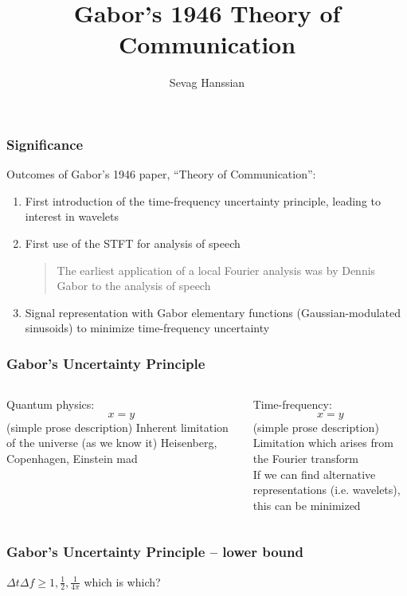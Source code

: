 \documentclass{beamer}
\title{Gabor's 1946 Theory of Communication}
\author{Sevag Hanssian}
\institute{MUMT 622, Winter 2021}
\begin{document}
\begin{frame}
\maketitle
\end{frame}

\begin{frame}
	\frametitle{Significance}
	Outcomes of Gabor's 1946 paper, ``Theory of Communication'':
	\vspace{0.5em}
	\begin{enumerate}
		\item
			First introduction of the time-frequency uncertainty principle, leading to interest in wavelets
		\item
			First use of the STFT for analysis of speech
			\begin{quote}
			The earliest application of a local Fourier analysis was by Dennis Gabor to the analysis of speech
			\end{quote}
		\item
			\vspace{-0.35em}
			Signal representation with Gabor elementary functions (Gaussian-modulated sinusoids) to minimize time-frequency uncertainty
	\end{enumerate}
\end{frame}

\begin{frame}
	\frametitle{Gabor's Uncertainty Principle}
	\begin{columns}
	    \begin{column}{0.48\textwidth}
		Quantum physics:
		    \[ x = y\]
		(simple prose description)
		Inherent limitation of the universe (as we know it)
		Heisenberg, Copenhagen, Einstein mad
	    \end{column}
	    \begin{column}{0.48\textwidth}
		Time-frequency: 
		    \[ x = y \]
		(simple prose description)
		Limitation which arises from the Fourier transform\\
		If we can find alternative representations (i.e. wavelets), this can be minimized
	    \end{column}
	\end{columns}
\end{frame}

\begin{frame}
	\frametitle{Gabor's Uncertainty Principle -- lower bound}
	$\Delta t \Delta f \ge 1, \frac{1}{2}, \frac{1}{4\pi}$
	which is which?
\end{frame}
\end{document}
